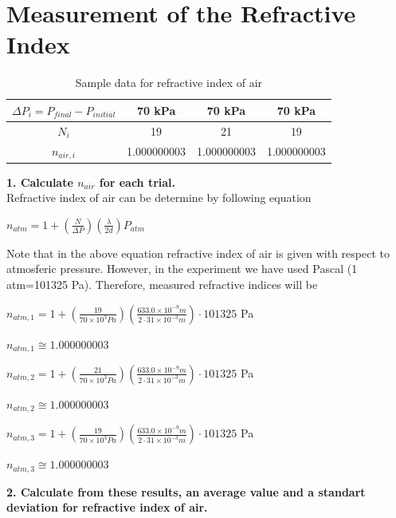 \documentclass[a4paper,12pt]{report}
\begin{document}
\section{Measurement of the Refractive Index}
\begin{table}[h!]
	\begin{center}
\begin{tabular}{|c|c|c|c|}
	\hline $\Delta P_{i}=P_{final}-P_{initial}$ & 70 kPa & 70 kPa & 70 kPa \\ 
	\hline $N_{i}$ & 19 & 21 & 19 \\ 
	\hline $n_{air,i}$ & 1.000000003 & 1.000000003 & 1.000000003 \\ 
	\hline 
\end{tabular}
\end{center}
\caption{Sample data for refractive index of air} 
\end{table}
\textbf{1. Calculate $n_{air}$ for each trial.}\\
Refractive index of air can be determine by following equation
\begin{center}
	{\Large $n_{atm}=1+(\frac{N}{\Delta P})(\frac{\lambda}{2d})P_{atm}$}
\end{center}
Note that in the above equation refractive index of air is given with respect to atmosferic pressure. However, in the experiment we have used Pascal (1 atm=101325 Pa). Therefore, measured refractive indices will be
\begin{center}
	{\large $n_{atm,1}=1+(\frac{19}{70\times10^{3}Pa})(\frac{633.0\times10^{-9}m}{2\cdot31\times10^{-3}m})\cdot101325$ Pa}
\end{center}
\begin{center}
$n_{atm,1}\cong1.000000003$
\end{center}
\begin{center}
	{\large $n_{atm,2}=1+(\frac{21}{70\times10^{3}Pa})(\frac{633.0\times10^{-9}m}{2\cdot31\times10^{-3}m})\cdot101325$ Pa}
\end{center}
\begin{center}
	$n_{atm,2}\cong1.000000003$
\end{center}
\begin{center}
	{\large $n_{atm,3}=1+(\frac{19}{70\times10^{3}Pa})(\frac{633.0\times10^{-9}m}{2\cdot31\times10^{-3}m})\cdot101325$ Pa}
\end{center}
\begin{center}
	$n_{atm,3}\cong1.000000003$
\end{center}
\textbf{2. Calculate from these results, an average value and a standart deviation for refractive index of air.}\\
\end{document}
